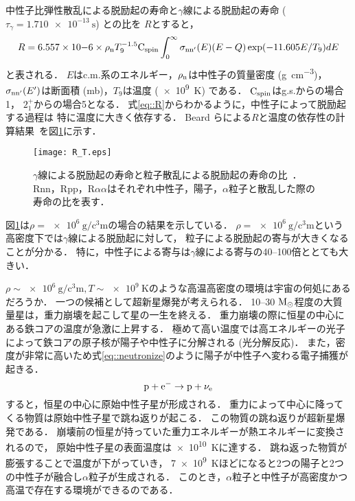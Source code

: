 \documentclass[../master]{subfiles}
\begin{document}
中性子比弾性散乱による脱励起の寿命と$\gamma$線による脱励起の寿命 ($\tau_{\gamma} = \SI{1.710e-13}{\second}$) との比を
$R$とすると，
\begin{equation}
  R = 6.557\times10{-6}\times\rho_{\rm n}T_{9}^{-1.5}{\rm C}_{{\rm spin}}
  \int^{\infty}_{0}\sigma_{\rm nn'}(E)(E-Q)\exp(-11.605E/T_{9})dE
  \label{eq::R}
\end{equation}
と表される．
$E$はc.m.系のエネルギー，$\rho_{\rm n}$は中性子の質量密度 (\si{\gram\per\cubic\centi\metre})，
$\sigma_{\rm nn'}(E')$は断面積 (\si{\milli\barn})，$T_{9}$は温度 (\SI{e9}{\kelvin}) である．
${\rm C}_{{\rm spin}}$はg.s.からの場合1，
$2_{1}^{+}$からの場合5となる．
式\eqref{eq::R}からわかるように，中性子によって脱励起する過程は
特に温度に大きく依存する．
Beard らによる$R$と温度の依存性の計算結果~\cite{hotdensemedium}を図\ref{fig::R}に示す．
\begin{figure}
  \centering
  \texttt{[image: R\_T.eps]}
  \caption[$\gamma$線による脱励起の寿命と粒子散乱による脱励起の寿命の比．]
          {$\gamma$線による脱励起の寿命と粒子散乱による脱励起の寿命の比~\cite{hotdensemedium}．
    Rnn，Rpp，R$\alpha\alpha$はそれぞれ中性子，陽子，$\alpha$粒子と散乱した際の寿命の比を表す．}
  \label{fig::R}
\end{figure}
図\ref{fig::R}は$\rho = \SI{e6}{\gram\per\cubic\centi\metre}$の場合の結果を示している．
$\rho = \SI{e6}{\gram\per\cubic\centi\metre}$という高密度下では$\gamma$線による脱励起に対して，
粒子による脱励起の寄与が大きくなることが分かる．
特に，中性子による寄与は$\gamma$線による寄与の40--100倍ととても大きい．

$\rho\sim\SI{e6}{\gram\per\cubic\centi\metre}, T\sim\SI{e9}{\kelvin}$のような高温高密度の環境は宇宙の何処にあるだろうか．
一つの候補として超新星爆発が考えられる．
10--30 $\rm M_{\odot}$程度の大質量星は，重力崩壊を起こして星の一生を終える．
重力崩壊の際に恒星の中心にある鉄コアの温度が急激に上昇する．
極めて高い温度では高エネルギーの光子によって鉄コアの原子核が陽子や中性子に分解される (光分解反応)．
また，密度が非常に高いため式\eqref{eq::neutronize}のように陽子が中性子へ変わる電子捕獲が起きる．
\begin{equation}
  {\rm p}+{\rm e}^{-} \rightarrow {\rm p}+\nu_{\rm e}
  \label{eq::neutronize}
\end{equation}
すると，恒星の中心に原始中性子星が形成される．
重力によって中心に降ってくる物質は原始中性子星で跳ね返りが起こる．
この物質の跳ね返りが超新星爆発である．
崩壊前の恒星が持っていた重力エネルギーが熱エネルギーに変換されるので，
原始中性子星の表面温度は\SI{e10}{\kelvin}に達する．
跳ね返った物質が膨張することで温度が下がっていき，
\SI{7e9}{\kelvin}ほどになると2つの陽子と2つの中性子が融合し$\alpha$粒子が生成される．
このとき，$\alpha$粒子と中性子が高密度かつ高温で存在する環境ができるのである．
\end{document}

